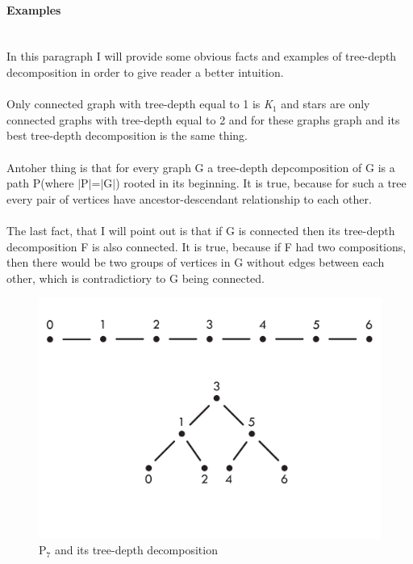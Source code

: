 \paragraph{Examples\\\\}
In this paragraph I will provide some obvious facts and examples of tree-depth decomposition in order to give reader a better intuition.\\\\
Only connected graph with tree-depth equal to 1 is \emph{K$_{1}$} and stars are only connected graphs with tree-depth equal to 2 and for these graphs graph and its best tree-depth decomposition is the same thing.\\\\
Antoher thing is that for every graph G a tree-depth depcomposition of G is a path P(where $|$P$|$=$|$G$|$) rooted in its beginning. It is true, because for such a tree every pair of vertices have ancestor-descendant relationship to each other.\\\\
The last fact, that I will point out is that if G is connected then its tree-depth decomposition F is also connected. It is true, because if F had two compositions, then there would be two groups of vertices in G without edges between each other, which is contradictiory to G being connected.
\begin{figure}[hbt!]
	\centering
	\includegraphics[scale=0.5,valign=t]{sciezka.pdf}
	\caption{P$_{7}$ and its tree-depth decomposition}
\end{figure}
\\\\\\\\
